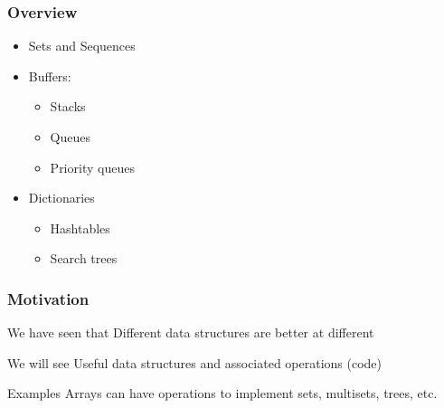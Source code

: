 \documentclass[aspectratio=169]{beamer}
\begin{document}
\frame[plain]{\titlepage}


\begin{frame}[t]\frametitle{Overview}

  \begin{itemize}
    \item Sets and Sequences
    \item Buffers: 
      \begin{itemize}
        \item Stacks
        \item Queues
        \item Priority queues
      \end{itemize}
    \item Dictionaries
      \begin{itemize}
        \item Hashtables
        \item Search trees
      \end{itemize}
  \end{itemize}


\end{frame}


\begin{frame}\frametitle{Motivation}
  \centering

  \begin{block}{We have seen that}
    Different \alert{data structures} are better at different 
  \end{block}

  \begin{block}{We will see}
    Useful data structures and associated operations (code)
  \end{block}

  \begin{exampleblock}{Examples}
    Arrays can have operations to implement sets, multisets, trees, etc.
  \end{exampleblock}

\end{frame}
\end{document}
